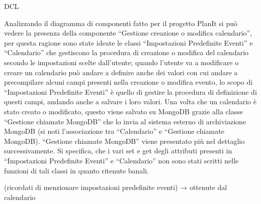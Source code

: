 \begin{listaPersonale}{DCL}
    \begin{listaPersonale2}[DCL]{}

        Analizzando il diagramma di componenti fatto per il progetto PlanIt si può vedere la presenza della componente “Gestione creazione o modifica calendario”, per questa ragione sono state ideate le classi “Impostazioni Predefinite Eventi” e “Calendario”  che gestiscono la procedura di creazione o modifica del calendario secondo le impostazioni scelte dall'utente; quando l'utente va a modificare o creare un calendario può andare a definire anche dei valori con cui andare a precompilare alcuni campi presenti nella creazione o modifica evento, lo scopo di “Impostazioni Predefinite Eventi” è quello di gestire la procedura di definizione di questi campi, andando anche a salvare i loro valori. Una volta che un calendario è stato creato o modificato, questo viene salvato su MongoDB grazie alla classe “Gestione chiamate MongoDB” che lo invia al sistema esterno di archiviazione MongoDB (si noti l'associazione tra “Calendario” e “Gestione chiamate MongoDB).
        “Gestione chiamate MongoDB” viene presentato più nel dettaglio successivamente.
        Si specifica, che i vari set e get degli attributi presenti in “Impostazioni Predefinite Eventi” e “Calendario” non sono stati scritti nelle funzioni di tali classi in quanto ritenute banali.
        \begin{comment}
            \begin{center}
                \\
                \blfootnote{Immagine \href{https://github.com/Life-planner/Documentazione/blob/main/D3/img/Diagrammi/png/path/to/img.png}{PNG}/\href{https://github.com/Life-planner/Documentazione/blob/main/D3/img/Diagrammi/svg/path/to/img.svg}{SVG} nome file}
            \end{center}
        \end{comment}



        (ricordati di menzionare impostazioni predefinite eventi) → ottenute dal calendario


\end{listaPersonale2}
\end{listaPersonale}
